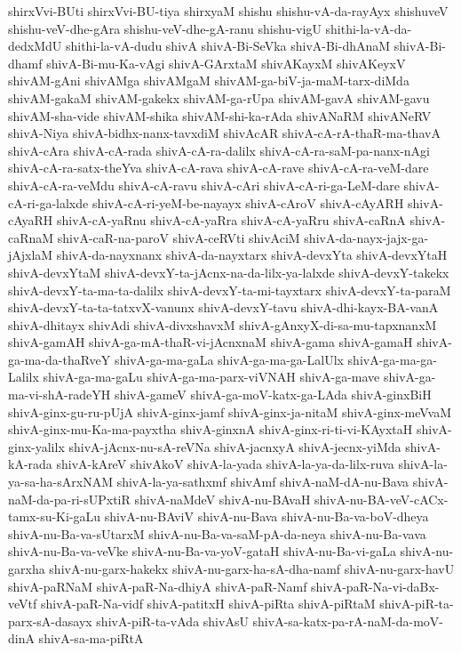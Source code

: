 {shirxVvi-BUti
shirxVvi-BU-tiya
shirxyaM
shishu
shishu-vA-da-rayAyx
shishuveV
shishu-veV-dhe-gAra
shishu-veV-dhe-gA-ranu
shishu-vigU
shithi-la-vA-da-dedxMdU
shithi-la-vA-dudu
shivA
shivA-Bi-SeVka
shivA-Bi-dhAnaM
shivA-Bi-dhamf
shivA-Bi-mu-Ka-vAgi
shivA-GArxtaM
shivAKayxM
shivAKeyxV
shivAM-gAni
shivAMga
shivAMgaM
shivAM-ga-biV-ja-maM-tarx-diMda
shivAM-gakaM
shivAM-gakekx
shivAM-ga-rUpa
shivAM-gavA
shivAM-gavu
shivAM-sha-vide
shivAM-shika
shivAM-shi-ka-rAda
shivANaRM
shivANeRV
shivA-Niya
shivA-bidhx-nanx-tavxdiM
shivAcAR
shivA-cA-rA-thaR-ma-thavA
shivA-cAra
shivA-cA-rada
shivA-cA-ra-dalilx
shivA-cA-ra-saM-pa-nanx-nAgi
shivA-cA-ra-satx-theYva
shivA-cA-rava
shivA-cA-rave
shivA-cA-ra-veM-dare
shivA-cA-ra-veMdu
shivA-cA-ravu
shivA-cAri
shivA-cA-ri-ga-LeM-dare
shivA-cA-ri-ga-lalxde
shivA-cA-ri-yeM-be-nayayx
shivA-cAroV
shivA-cAyARH
shivA-cAyaRH
shivA-cA-yaRnu
shivA-cA-yaRra
shivA-cA-yaRru
shivA-caRnA
shivA-caRnaM
shivA-caR-na-paroV
shivA-ceRVti
shivAciM
shivA-da-nayx-jajx-ga-jAjxlaM
shivA-da-nayxnanx
shivA-da-nayxtarx
shivA-devxYta
shivA-devxYtaH
shivA-devxYtaM
shivA-devxY-ta-jAcnx-na-da-lilx-ya-lalxde
shivA-devxY-takekx
shivA-devxY-ta-ma-ta-dalilx
shivA-devxY-ta-mi-tayxtarx
shivA-devxY-ta-paraM
shivA-devxY-ta-ta-tatxvX-vanunx
shivA-devxY-tavu
shivA-dhi-kayx-BA-vanA
shivA-dhitayx
shivAdi
shivA-divxshavxM
shivA-gAnxyX-di-sa-mu-tapxnanxM
shivA-gamAH
shivA-ga-mA-thaR-vi-jAcnxnaM
shivA-gama
shivA-gamaH
shivA-ga-ma-da-thaRveY
shivA-ga-ma-gaLa
shivA-ga-ma-ga-LalUlx
shivA-ga-ma-ga-Lalilx
shivA-ga-ma-gaLu
shivA-ga-ma-parx-viVNAH
shivA-ga-mave
shivA-ga-ma-vi-shA-radeYH
shivA-gameV
shivA-ga-moV-katx-ga-LAda
shivA-ginxBiH
shivA-ginx-gu-ru-pUjA
shivA-ginx-jamf
shivA-ginx-ja-nitaM
shivA-ginx-meVvaM
shivA-ginx-mu-Ka-ma-payxtha
shivA-ginxnA
shivA-ginx-ri-ti-vi-KAyxtaH
shivA-ginx-yalilx
shivA-jAcnx-nu-sA-reVNa
shivA-jacnxyA
shivA-jecnx-yiMda
shivA-kA-rada
shivA-kAreV
shivAkoV
shivA-la-yada
shivA-la-ya-da-lilx-ruva
shivA-la-ya-sa-ha-sArxNAM
shivA-la-ya-sathxmf
shivAmf
shivA-naM-dA-nu-Bava
shivA-naM-da-pa-ri-sUPxtiR
shivA-naMdeV
shivA-nu-BAvaH
shivA-nu-BA-veV-cACx-tamx-su-Ki-gaLu
shivA-nu-BAviV
shivA-nu-Bava
shivA-nu-Ba-va-boV-dheya
shivA-nu-Ba-va-sUtarxM
shivA-nu-Ba-va-saM-pA-da-neya
shivA-nu-Ba-vava
shivA-nu-Ba-va-veVke
shivA-nu-Ba-va-yoV-gataH
shivA-nu-Ba-vi-gaLa
shivA-nu-garxha
shivA-nu-garx-hakekx
shivA-nu-garx-ha-sA-dha-namf
shivA-nu-garx-havU
shivA-paRNaM
shivA-paR-Na-dhiyA
shivA-paR-Namf
shivA-paR-Na-vi-daBx-veVtf
shivA-paR-Na-vidf
shivA-patitxH
shivA-piRta
shivA-piRtaM
shivA-piR-ta-parx-sA-dasayx
shivA-piR-ta-vAda
shivAsU
shivA-sa-katx-pa-rA-naM-da-moV-dinA
shivA-sa-ma-piRtA
}
